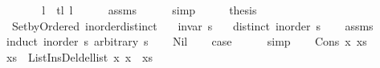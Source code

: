 \begin{isabellebody}
\ \ \isamarkupfalse%
\ \isamarkupfalse%
\ {\isachardoublequoteopen}{\isachardot}{\kern0pt}{\isachardot}{\kern0pt}{\isachardot}{\kern0pt}\ {\isacharequal}{\kern0pt}\ l{}\ {\isacharat}{\kern0pt}\ tl\ l{}{\isachardoublequoteclose}\isanewline
\ \ \ \ \isamarkupfalse%
\ assms{\isacharparenleft}{\kern0pt}{}{\isacharparenright}{\kern0pt}\isanewline
\ \ \ \ \isamarkupfalse%
\ simp\isanewline
\ \ \isamarkupfalse%
\ \isamarkupfalse%
\ {\isacharquery}{\kern0pt}thesis\isanewline
\ \ \ \ \isacommand{{\isachardot}{\kern0pt}}\isamarkupfalse%
\isanewline
{}\isamarkupfalse%
%
\endisatagproof
{\isafoldproof}%
%
\isadelimproof
%
\endisadelimproof
%
\isadeliminvisible
%
\endisadeliminvisible
%
\isataginvisible
%
\isamarkuptrue%
\isamarkupfalse%
\ {\isacharparenleft}{\kern0pt}\ Set{\isacharunderscore}{\kern0pt}by{\isacharunderscore}{\kern0pt}Ordered{\isacharparenright}{\kern0pt}\ inorder{\isacharunderscore}{\kern0pt}distinct{\isacharcolon}{\kern0pt}\isanewline
\ \ \ {\isachardoublequoteopen}invar\ s{\isachardoublequoteclose}\isanewline
\ \ \ {\isachardoublequoteopen}distinct\ {\isacharparenleft}{\kern0pt}inorder\ s{\isacharparenright}{\kern0pt}{\isachardoublequoteclose}%
\endisataginvisible
{\isafoldinvisible}%
%
\isadeliminvisible
\isanewline
%
\endisadeliminvisible
%
\isadelimproof
\ \ %
\endisadelimproof
%
\isatagproof
{}\isamarkupfalse%
\ assms\isanewline
{}\isamarkupfalse%
\ {\isacharparenleft}{\kern0pt}induct\ {\isachardoublequoteopen}inorder\ s{\isachardoublequoteclose}\ arbitrary{\isacharcolon}{\kern0pt}\ s{\isacharparenright}{\kern0pt}\isanewline
\ \ \isamarkupfalse%
\ Nil\isanewline
\ \ \isamarkupfalse%
\ {\isacharquery}{\kern0pt}case\isanewline
\ \ \ \ \isamarkupfalse%
\ simp\isanewline
{}\isamarkupfalse%
\isanewline
\ \ \isamarkupfalse%
\ {\isacharparenleft}{\kern0pt}Cons\ x\ xs{\isacharparenright}{\kern0pt}\isanewline
\ \ \isamarkupfalse%
\ {\isachardoublequoteopen}xs\ {\isacharequal}{\kern0pt}\ List{\isacharunderscore}{\kern0pt}Ins{\isacharunderscore}{\kern0pt}Del{\isachardot}{\kern0pt}del{\isacharunderscore}{\kern0pt}list\ x\ {\isacharparenleft}{\kern0pt}x\ {\isacharhash}{\kern0pt}\ xs{\isacharparenright}{\kern0pt}{\isachardoublequoteclose}\isanewline

\end{isabellebody}
